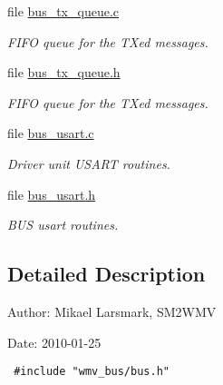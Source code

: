 \begin{CompactItemize}
\item 
file \hyperlink{bus__tx__queue_8c}{bus\_\-tx\_\-queue.c}
\begin{CompactList}\small\item\em FIFO queue for the TXed messages. \item\end{CompactList}

\item 
file \hyperlink{bus__tx__queue_8h}{bus\_\-tx\_\-queue.h}
\begin{CompactList}\small\item\em FIFO queue for the TXed messages. \item\end{CompactList}

\item 
file \hyperlink{bus__usart_8c}{bus\_\-usart.c}
\begin{CompactList}\small\item\em Driver unit USART routines. \item\end{CompactList}

\item 
file \hyperlink{bus__usart_8h}{bus\_\-usart.h}
\begin{CompactList}\small\item\em BUS usart routines. \item\end{CompactList}

\end{CompactItemize}


\subsection{Detailed Description}
\begin{Desc}
\item[Author:]Mikael Larsmark, SM2WMV \end{Desc}
\begin{Desc}
\item[Date:]2010-01-25 

\begin{Code}\begin{verbatim} #include "wmv_bus/bus.h" 
\end{verbatim}
\end{Code}

 \end{Desc}
